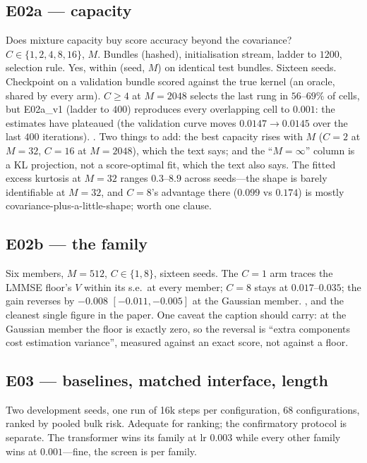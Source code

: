 \subsection{E02a --- capacity}
 Does mixture capacity buy score accuracy beyond the covariance?  $C\in\{1,2,4,8,16\}$, $M$.  Bundles (hashed), initialisation stream, ladder to $1200$, selection rule.  Yes, within (seed, $M$) on identical test bundles.  Sixteen seeds.  Checkpoint on a validation bundle scored against the true kernel (an oracle, shared by every arm).  $C\ge4$ at $M=2048$ selects the last rung in $56$--$69\%$ of cells, but E02a\_v1 (ladder to $400$) reproduces every overlapping cell to $0.001$: the estimates have plateaued (the validation curve moves $0.0147\to0.0145$ over the last $400$ iterations). . Two things to add: the best capacity rises with $M$ ($C=2$ at $M=32$, $C=16$ at $M=2048$), which the text says; and the ``$M=\infty$'' column is a KL projection, not a score-optimal fit, which the text also says. The fitted excess kurtosis at $M=32$ ranges $0.3$--$8.9$ across seeds---the shape is barely identifiable at $M=32$, and $C=8$'s advantage there ($0.099$ vs $0.174$) is mostly covariance-plus-a-little-shape; worth one clause.

\subsection{E02b --- the family}
Six members, $M=512$, $C\in\{1,8\}$, sixteen seeds. The $C=1$ arm traces the LMMSE floor's $V$ within its s.e.\ at every member; $C=8$ stays at $0.017$--$0.035$; the gain reverses by $-0.008$ $[-0.011,-0.005]$ at the Gaussian member. , and the cleanest single figure in the paper. One caveat the caption should carry: at the Gaussian member the floor is exactly zero, so the reversal is ``extra components cost estimation variance'', measured against an exact score, not against a floor.

\subsection{E03 --- baselines, matched interface, length}
 Two development seeds, one run of 16k steps per configuration, 68 configurations, ranked by pooled bulk risk. Adequate for ranking; the confirmatory protocol is separate. The transformer wins its family at lr $0.003$ while every other family wins at $0.001$---fine, the screen is per family.

